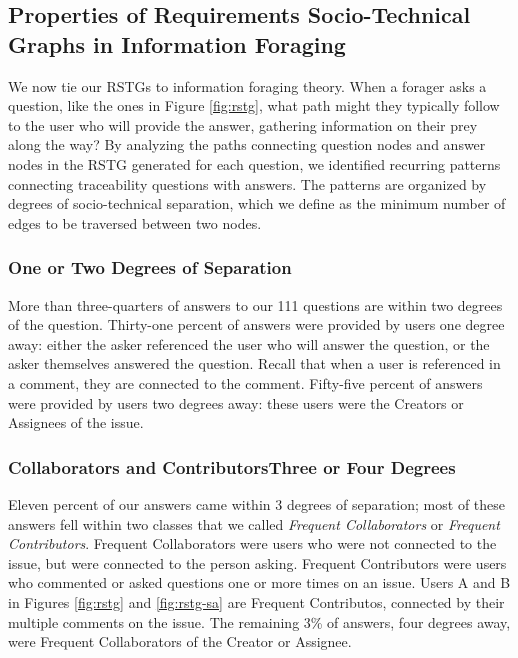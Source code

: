 \documentclass[conference]{IEEEtran}
\begin{document}
\subsection{Properties of Requirements Socio-Technical Graphs in Information Foraging}

We now tie our RSTGs to information foraging theory. When a forager asks a question, like the ones in Figure \ref{fig:rstg}, what path might they typically follow to the user who will provide the answer, gathering information on their prey along the way? By analyzing the paths connecting question nodes and answer nodes in the RSTG generated for each question, we identified recurring patterns connecting traceability questions with answers. The patterns are organized by degrees of socio-technical separation, which we define as the minimum number of edges to be traversed between two nodes. 

\subsubsection{One or Two Degrees of Separation}
More than three-quarters of answers to our 111 questions are within two degrees of the question. Thirty-one percent of answers were provided by users one degree away: either the asker referenced the user who will answer the question, or the asker themselves answered the question. Recall that when a user is referenced in a comment, they are connected to the comment. Fifty-five percent of answers were provided by users two degrees away: these users were the Creators or Assignees of the issue.

\subsubsection{Collaborators and Contributors\textemdash Three or Four Degrees} 
Eleven percent of our answers came within 3 degrees of separation; most of these answers fell within two classes that we called \textit{Frequent Collaborators} or \textit{Frequent Contributors}. Frequent Collaborators were users who were not connected to the issue, but were connected to the person asking. Frequent Contributors were users who commented or asked questions one or more times on an issue. Users A and B in Figures \ref{fig:rstg} and \ref{fig:rstg-sa} are Frequent Contributos, connected by their multiple comments on the issue. The remaining 3\% of answers, four degrees away, were Frequent Collaborators of the Creator or Assignee.
\end{document}
